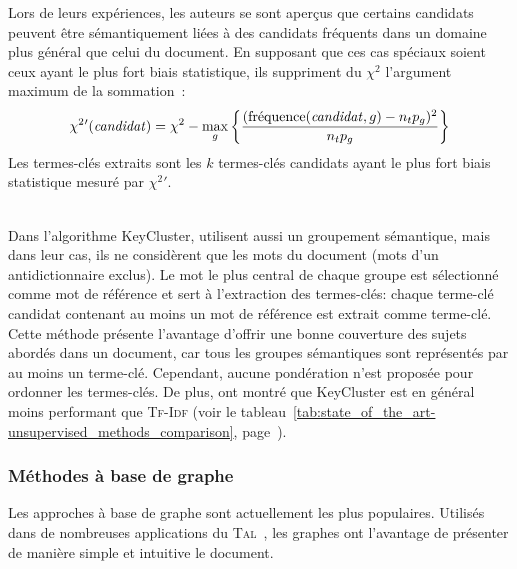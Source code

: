         Lors de leurs expériences, les auteurs se sont aperçus que certains
        candidats peuvent être sémantiquement liées à des candidats fréquents
        dans un domaine plus général que celui du document. En supposant que ces
        cas spéciaux soient ceux ayant le plus fort biais statistique, ils
        suppriment du $\chi^2$ l'argument maximum de la sommation~:
        \begin{align}
          \chi^2{'}(\text{\textit{candidat}}) = \chi^2 - \max_{g}\left\{\frac{(\text{fréquence}(\text{\textit{candidat}}, g) - n_tp_g)^2}{n_tp_g}\right\}
        \end{align}
        Les termes-clés extraits sont les $k$ termes-clés candidats ayant le
        plus fort biais statistique mesuré par $\chi^2{'}$.

        ~\\Dans l'algorithme KeyCluster,  utilisent
        aussi un groupement sémantique, mais dans leur cas, ils ne considèrent
        que les mots du document (mots d'un antidictionnaire exclus). Le mot le
        plus central de chaque groupe est sélectionné comme mot de référence et
        sert à l'extraction des termes-clés: chaque terme-clé candidat contenant
        au moins un mot de référence est extrait comme terme-clé. Cette méthode
        présente l'avantage d'offrir une bonne couverture des sujets abordés
        dans un document, car tous les groupes sémantiques sont représentés par
        au moins un terme-clé. Cependant, aucune pondération n'est proposée pour
        ordonner les termes-clés. De plus,  ont
        montré que KeyCluster est en général moins performant que \textsc{Tf-Idf}
        (voir le tableau~\ref{tab:state_of_the_art-unsupervised_methods_comparison},
        page~\pageref{tab:state_of_the_art-unsupervised_methods_comparison}).

      \subsubsection{Méthodes à base de graphe}
      \label{subsubsec:main-state_of_the_art-automatic_keyphrase_extraction-unsupervised_keyphrase_extraction-graph_based_approaches}
        Les approches à base de graphe sont actuellement les plus populaires.
        Utilisés dans de nombreuses applications du
        \textsc{Tal}~\cite{kozareva2013textgraphs}, les graphes ont l'avantage
        de présenter de manière simple et intuitive le document.


